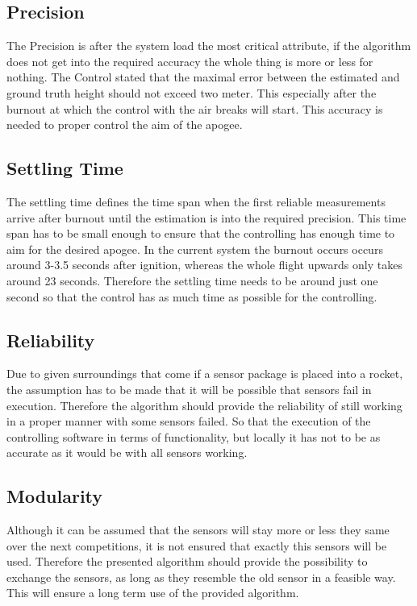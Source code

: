  \subsection{Precision}
 The Precision is after the system load the most critical attribute, if the algorithm does not get into the required accuracy the whole thing is more or less for nothing.
 The Control stated that the maximal error between the estimated and ground truth height should not exceed two meter. 
 This especially after the burnout at which the control with the air breaks will start.
 This accuracy is needed to proper control the aim of the apogee.
 
 \subsection{Settling Time}
 The settling time defines the time span when the first reliable measurements arrive after burnout until the estimation is into the required precision.
 This time span has to be small enough to ensure that the controlling has enough time to aim for the desired apogee. In the current system the burnout occurs 
 occurs around 3-3.5 seconds after ignition, whereas the whole flight upwards only takes around 23 seconds. Therefore the settling time needs to be around just
 one second so that the control has as much time as possible for the controlling.
 
 \subsection{Reliability}
 Due to given surroundings that come if a sensor package is placed into a rocket, the assumption has to be made that it will be possible that sensors fail in execution.
 Therefore the algorithm should provide the reliability of still working in a proper manner with some sensors failed. So that the execution of the controlling software
 in terms of functionality, but locally it has not to be as accurate as it would be with all sensors working.

 \subsection{Modularity}
 Although it can be assumed that the sensors will stay more or less they same over the next competitions, it is not ensured that exactly this sensors will be used.
 Therefore the presented algorithm should provide the possibility to exchange the sensors, as long as they resemble the old sensor in a feasible way.
 This will ensure a long term use of the provided algorithm.
 

